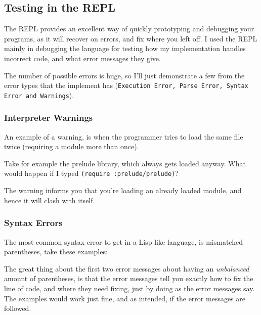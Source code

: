 \documentclass{article}
\newcommand{\code}[1]{\texttt{#1}}
\begin{document}
  \subsection{Testing in the REPL}
    The REPL provides an excellent way of quickly prototyping and debugging your
    programs, as it will recover on errors, and fix where you left off.
    I used the REPL mainly in debugging the language for testing how my
    implementation handles incorrect code, and what error messages they give.

    The number of possible errors is huge, so I'll just demonstrate a few from the
    error types that the implement has (\code{Execution Error, Parse Error, Syntax Error
    and Warnings}).

    \subsubsection{Interpreter Warnings}
      An example of a warning, is when the programmer tries to load
      the same file twice (requiring a module more than once).

      Take for example the prelude library, which always gets loaded anyway.
      What would happen if I typed \code{(require :prelude/prelude)}?


      The warning informs you that you're loading an already loaded module, and
      hence it will clash with itself.

    \subsubsection{Syntax Errors}
      The most common syntax error to get in a Lisp like language, is
      mismatched parentheses, take these examples:


      The great thing about the first two error messages about having an
      \emph{unbalanced} amount of parentheses, is that the error messages
      tell you exactly how to fix the line of code, and where they need
      fixing, just by doing as the error messages say. The examples
      would work just fine, and as intended, if the error messages are followed.
\end{document}

